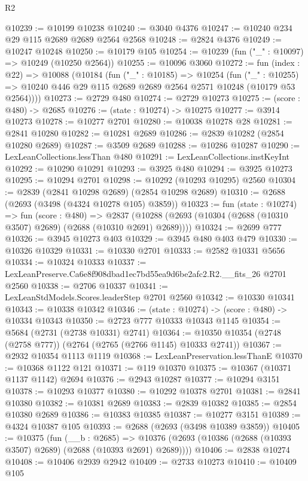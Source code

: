 \begin{lexlean}{R2}
\begin{coremodule}
@10239 := @10199 @10238
@10240 := @3040 @4376
@10247 := @10240 @234 @29 @115 @2689 @2689 @2564 @2568
@10248 := @2824 @4376
@10249 := @10247 @10248
@10250 := @10179 @105
@10254 := @10239 (fun ("_" : @10097) => @10249 (@10250 @2564))
@10255 := @10096 @3060
@10272 := fun (index : @22) =>
  @10088
    (@10184
      (fun ("_" : @10185) =>
      @10254
        (fun ("_" : @10255) =>
        @10240 @446 @29 @115 @2689 @2689 @2564 @2571 @10248 (@10179 @53 @2564))))
@10273 := @2729 @480
@10274 := @2729 @10273
@10275 := (score : @480) -> @2685
@10276 := (state : @10274) -> @10275
@10277 := @3914 @10273
@10278 := @10277 @2701
@10280 := @10038 @10278 @28
@10281 := @2841 @10280
@10282 := @10281 @2689
@10286 := @2839 @10282 (@2854 @10280 @2689)
@10287 := @3509 @2689
@10288 := @10286 @10287
@10290 := LexLeanCollections.lessThan @480
@10291 := LexLeanCollections.instKeyInt
@10292 := @10290 @10291
@10293 := @3925 @480
@10294 := @3925 @10273
@10295 := @10294 @2701
@10298 := @10292 (@10293 @10295) @2560
@10304 := @2839 (@2841 @10298 @2689) (@2854 @10298 @2689)
@10310 := @2688 (@2693 (@3498 (@4324 @10278 @105) @3859))
@10323 := fun (state : @10274) =>
  fun (score : @480) =>
  @2837 (@10288 (@2693 (@10304 (@2688 (@10310 @3507) @2689) (@2688 (@10310 @2691) @2689))))
@10324 := @2699 @777
@10326 := @3945 @10273 @403
@10329 := @3945 @480 @403 @479
@10330 := @10326 @10329
@10331 := @10330 @2701
@10333 := @2582 @10331 @5656
@10334 := @10324 @10333
@10337 := LexLeanPreserve.Ca6e8f908dbad1ec7bd55ea9d6be2afc2.R2.__fits_26 @2701 @2560
@10338 := @2706 @10337
@10341 := LexLeanStdModels.Scores.leaderStep @2701 @2560
@10342 := @10330 @10341
@10343 := @10338 @10342
@10346 := (state : @10274) -> (score : @480) -> @10334 @10343
@10350 := @2723 @777 @10333 @10343 @1145
@10354 := @5684 (@2731 (@2738 @10331) @2741)
@10364 := @10350 @10354 (@2748 (@2758 @777)) (@2764 (@2765 (@2766 @1145) @10333 @2741))
@10367 := @2932 @10354 @1113 @1119
@10368 := LexLeanPreservation.lessThanE
@10370 := @10368 @1122 @121
@10371 := @119 @10370
@10375 := @10367 (@10371 @1137 @1142) @2694
@10376 := @2943 @10287
@10377 := @10294 @3151
@10378 := @10293 @10377
@10380 := @10292 @10378 @2701
@10381 := @2841 @10380
@10382 := @10381 @2689
@10383 := @2839 @10382
@10385 := @2854 @10380 @2689
@10386 := @10383 @10385
@10387 := @10277 @3151
@10389 := @4324 @10387 @105
@10393 := @2688 (@2693 (@3498 @10389 @3859))
@10405 := @10375
    (fun (__b : @2685) =>
    @10376 (@2693 (@10386 (@2688 (@10393 @3507) @2689) (@2688 (@10393 @2691) @2689))))
@10406 := @2838 @10274
@10408 := @10406 @2939 @2942
@10409 := @2733 @10273
@10410 := @10409 @105

\end{coremodule}
\end{lexlean}
